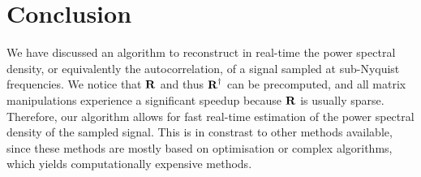 \documentclass[a4paper, openany, oneside]{memoir}
\begin{document}
\section{Conclusion}
We have discussed an algorithm to reconstruct in real-time the power spectral density, or equivalently the autocorrelation, of a signal sampled at sub-Nyquist frequencies. We notice that $\boldsymbol{\mathbf{R}}$ and thus $\boldsymbol{\mathbf{R}}^\dagger$ can be precomputed, and all matrix manipulations experience a significant speedup because $\boldsymbol{\mathbf{R}}$ is usually sparse. Therefore, our algorithm allows for fast real-time estimation of the power spectral density of the sampled signal. This is in constrast to other methods available, since these methods are mostly based on optimisation or complex algorithms, which yields computationally expensive methods.
\end{document}
